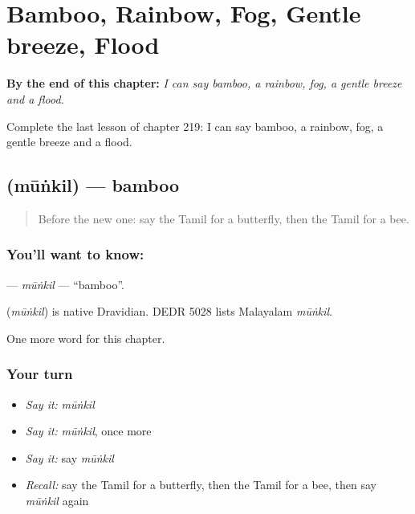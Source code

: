 
\chapter{Bamboo, Rainbow, Fog, Gentle breeze, Flood}
\label{ch:ta-bamboo-rainbow-fog-gentle-breeze-flood}

\begin{chapteropening}
\textbf{By the end of this chapter:} \emph{I can say bamboo, a rainbow, fog, a gentle breeze and a flood.}

Complete the last lesson of chapter 219: I can say bamboo, a rainbow, fog, a gentle breeze and a flood.
\end{chapteropening}

\section[\texorpdfstring{\ta{மூங்கில்} (mūṅkil)}{மூங்கில் (mūṅkil)}]{ (mūṅkil) — bamboo}

\label{lesson:TA-C219-munkil}



\begin{quote}
Before the new one: say the Tamil for a butterfly, then the Tamil for a bee.
\end{quote}

\subsection*{You'll want to know: }
\textbf{} — \emph{mūṅkil} — \textquotedblleft{}bamboo\textquotedblright{}.

\begin{cousinweb}
\textbf{} (\emph{mūṅkil}) is native Dravidian. DEDR 5028 lists Malayalam \emph{mūṅkil}.
\end{cousinweb}

\begin{grammarlens}[title={What you've built}]
One more word for this chapter.
\end{grammarlens}

\subsection*{Your turn}
\begin{itemize}
\raggedright
  \item \emph{Say it:} \emph{mūṅkil}
  \item \emph{Say it:} \emph{mūṅkil}, once more
  \item \emph{Say it:} say \emph{mūṅkil}
  \item \emph{Recall:} say the Tamil for a butterfly, then the Tamil for a bee, then say \emph{mūṅkil} again
\end{itemize}

